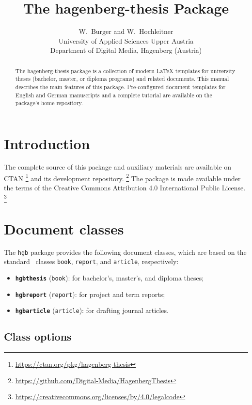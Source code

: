 \documentclass[english]{hgbarticle}
\title{The \textsf{hagenberg-thesis} Package}
\date{\hgbDate}
\author{W.\ Burger and W.\ Hochleitner\\[10pt]
University of Applied Sciences Upper Austria\\
Department of Digital Media, Hagenberg (Austria)}
\begin{document}
\maketitle

\begin{abstract}\noindent
The \textsf{hagenberg-thesis} package is a collection of modern LaTeX
templates for university theses (bachelor, master, or diploma programs) and
related documents. This manual describes the main features of this package.
Pre-configured document templates for English and German manuscripts and a
complete tutorial are available on the package's home repository.
\end{abstract}


\section{Introduction}

The complete source of this package and auxiliary materials are available on
CTAN%
\footnote{\url{https://ctan.org/pkg/hagenberg-thesis}}
and its development repository.%
\footnote{\url{https://github.com/Digital-Media/HagenbergThesis}}
The package is made available under the terms of the Creative Commons
Attribution 4.0 International Public License.%
\footnote{\url{https://creativecommons.org/licenses/by/4.0/legalcode}}


\section{Document classes}

The \texttt{hgb} package provides the following document classes, which are
based on the standard \latex\ classes \texttt{book}, \texttt{report}, and
\texttt{article}, respectively:
%
\begin{itemize}
    \item \textbf{\texttt{hgbthesis}} (\texttt{book}):
    for bachelor's, master's, and diploma theses;
    \item \textbf{\texttt{hgbreport}} (\texttt{report}):
    for project and term reports;
    \item \textbf{\texttt{hgbarticle}} (\texttt{article}):
    for drafting journal articles.
\end{itemize}


\subsection{Class options}
\end{document}
